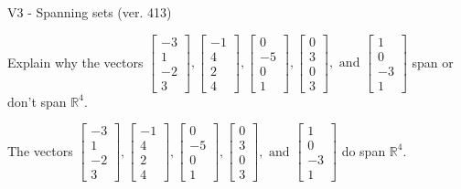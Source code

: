 \begin{exercise}
  \begin{exerciseTitle}V3 - Spanning sets (ver. 413)\end{exerciseTitle}
  \begin{exerciseStatement}
    Explain why the vectors \(\left[\begin{array}{r}
-3 \\
1 \\
-2 \\
3
\end{array}\right] , \left[\begin{array}{r}
-1 \\
4 \\
2 \\
4
\end{array}\right] , \left[\begin{array}{r}
0 \\
-5 \\
0 \\
1
\end{array}\right] , \left[\begin{array}{r}
0 \\
3 \\
0 \\
3
\end{array}\right] , \text{ and } \left[\begin{array}{r}
1 \\
0 \\
-3 \\
1
\end{array}\right]\) span or don't span \(\mathbb{R}^4\). 
	


  \end{exerciseStatement}
  \begin{exerciseAnswer}
   The vectors \(\left[\begin{array}{r}
-3 \\
1 \\
-2 \\
3
\end{array}\right] , \left[\begin{array}{r}
-1 \\
4 \\
2 \\
4
\end{array}\right] , \left[\begin{array}{r}
0 \\
-5 \\
0 \\
1
\end{array}\right] , \left[\begin{array}{r}
0 \\
3 \\
0 \\
3
\end{array}\right] , \text{ and } \left[\begin{array}{r}
1 \\
0 \\
-3 \\
1
\end{array}\right]\) 
  	 do  
	span \(\mathbb{R}^4\).
  


  \end{exerciseAnswer}
\end{exercise}